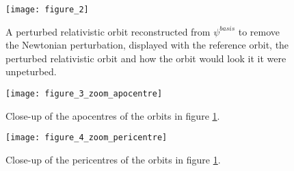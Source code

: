 \documentclass[11pt,a4paper]{article}
\begin{document}
\begin{figure}[h]
\centerline{\texttt{[image: figure\_2]}}
\caption{A perturbed relativistic orbit reconstructed from $\psi^{basis}$ to remove the Newtonian perturbation, displayed with the reference orbit, the perturbed relativistic orbit and how the orbit would look it it were unpeturbed. \label{fig:recon}}
\end{figure}

\begin{figure}[h]
\centerline{\texttt{[image: figure\_3\_zoom\_apocentre]}}
\caption{Close-up of the apocentres of the orbits in figure \ref{fig:recon}. \label{fig:apo}}
\end{figure}

\begin{figure}[h]
\centerline{\texttt{[image: figure\_4\_zoom\_pericentre]}}
\caption{Close-up of the pericentres of the orbits in figure \ref{fig:recon}. \label{fig:peri}}
\end{figure}










\end{document}
